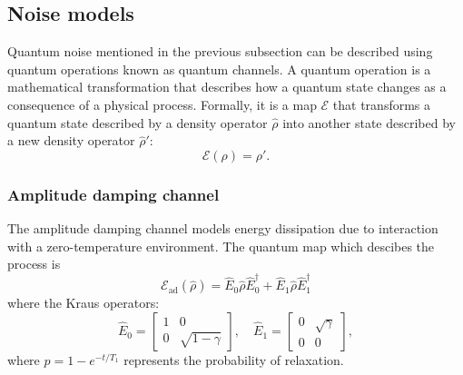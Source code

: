 \subsection{Noise models}
Quantum noise mentioned in the previous subsection can be described using quantum operations known as quantum channels. 
A quantum operation is a mathematical transformation that describes how a quantum state changes as a consequence of a physical process. 
Formally, it is a map $\mathcal{E}$ that transforms a quantum state described by a density operator $\hat{\rho}$ into another state described by a new density operator $\hat{\rho}'$:
\begin{equation}
    \mathcal{E}(\rho) = \rho'\label{eq:quantum_map}.
\end{equation}

\subsubsection{Amplitude damping channel}
The amplitude damping channel models energy dissipation due to interaction with a zero-temperature environment. The quantum map which descibes the process is 
\begin{equation}\label{eq:amplitude_damping}
    \mathcal{E}_{\text{ad}}(\hat{\rho}) = \hat{E}_0 \hat{\rho} \hat{E}_0^{\dagger} + \hat{E}_1 \hat{\rho} \hat{E}_1^{\dagger}
\end{equation}
where the Kraus operators:
\begin{equation}
    \hat{E}_0 = \begin{bmatrix} 1 & 0 \\ 0 & \sqrt{1 - \gamma} \end{bmatrix}, \quad
    \hat{E}_1 = \begin{bmatrix} 0 & \sqrt{\gamma} \\ 0 & 0 \end{bmatrix},
\end{equation}
where $p = 1 - e^{-t/T_1}$ represents the probability of relaxation.

